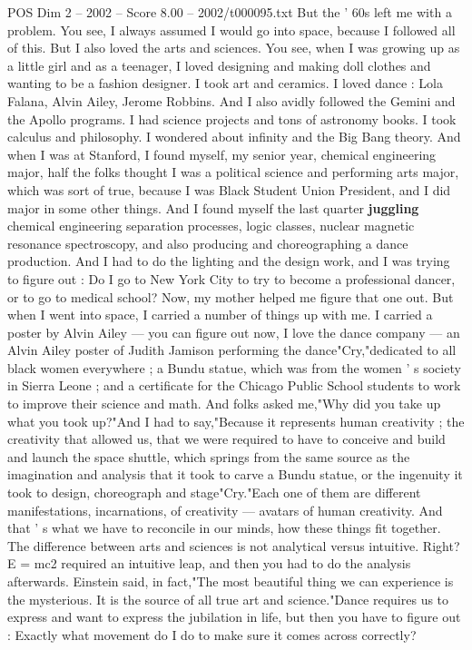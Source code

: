 \begin{textsample}{POS Dim 2 – 2002 – Score 8.00 – 2002/t000095.txt}
But the ' 60s left me with a problem.
You see, I always assumed I would go into space, because I followed all of this.
But I also loved the arts and sciences.
You see, when I was growing up as a little girl and as a teenager, I loved designing and making doll clothes and wanting to be a fashion designer.
I took art and ceramics.
I loved dance : Lola Falana, Alvin Ailey, Jerome Robbins.
And I also avidly followed the Gemini and the Apollo programs.
I had science projects and tons of astronomy books.
I took calculus and philosophy.
I wondered about infinity and the Big Bang theory.
And when I was at Stanford, I found myself, my senior year, chemical engineering major, half the folks thought I was a political science and performing arts major, which was sort of true, because I was Black Student Union President, and I did major in some other things.
And I found myself the last quarter \textbf{juggling} chemical engineering separation processes, logic classes, nuclear magnetic resonance spectroscopy, and also producing and choreographing a dance production.
And I had to do the lighting and the design work, and I was trying to figure out : Do I go to New York City to try to become a professional dancer, or to go to medical school?
Now, my mother helped me figure that one out.
But when I went into space, I carried a number of things up with me.
I carried a poster by Alvin Ailey — you can figure out now, I love the dance company — an Alvin Ailey poster of Judith Jamison performing the dance"Cry,"dedicated to all black women everywhere ; a Bundu statue, which was from the women ' s society in Sierra Leone ; and a certificate for the Chicago Public School students to work to improve their science and math.
And folks asked me,"Why did you take up what you took up?"And I had to say,"Because it represents human creativity ; the creativity that allowed us, that we were required to have to conceive and build and launch the space shuttle, which springs from the same source as the imagination and analysis that it took to carve a Bundu statue, or the ingenuity it took to design, choreograph and stage"Cry."Each one of them are different manifestations, incarnations, of creativity — avatars of human creativity.
And that ' s what we have to reconcile in our minds, how these things fit together.
The difference between arts and sciences is not analytical versus intuitive.
Right?
E = mc2 required an intuitive leap, and then you had to do the analysis afterwards.
Einstein said, in fact,"The most beautiful thing we can experience is the mysterious.
It is the source of all true art and science."Dance requires us to express and want to express the jubilation in life, but then you have to figure out : Exactly what movement do I do to make sure it comes across correctly?

\end{textsample}
